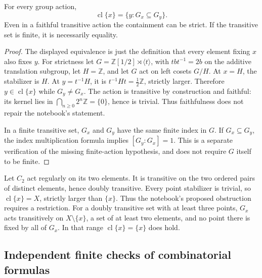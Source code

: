 \begin{proposition}\ours
For every group action,
\[
 \operatorname{cl}\{x\}=\{y:G_x\subseteq G_y\}.
\]
Even in a faithful transitive action the containment can be strict. If the transitive set is finite, it is necessarily equality.
\end{proposition}
\begin{proof}
The displayed equivalence is just the definition that every element fixing \(x\) also fixes \(y\). For strictness let \(G=\mathbb Z[1/2]\rtimes\langle t\rangle\), with \(tbt^{-1}=2b\) on the additive translation subgroup, let \(H=\mathbb Z\), and let \(G\) act on left cosets \(G/H\). At \(x=H\), the stabilizer is \(H\). At \(y=t^{-1}H\), it is \(t^{-1}Ht=\tfrac12\mathbb Z\), strictly larger. Therefore \(y\in\operatorname{cl}\{x\}\) while \(G_y\ne G_x\). The action is transitive by construction and faithful: its kernel lies in \(\bigcap_{n\ge0}2^n\mathbb Z=\{0\}\), hence is trivial. Thus faithfulness does not repair the notebook's statement.

In a finite transitive set, \(G_x\) and \(G_y\) have the same finite index in \(G\). If \(G_x\subseteq G_y\), the index multiplication formula implies \([G_y:G_x]=1\). This is a separate verification of the missing finite-action hypothesis, and does not require \(G\) itself to be finite.
\end{proof}

\begin{example}\ours
Let \(C_2\) act regularly on its two elements. It is transitive on the two ordered pairs of distinct elements, hence doubly transitive. Every point stabilizer is trivial, so \(\operatorname{cl}\{x\}=X\), strictly larger than \(\{x\}\). Thus the notebook's proposed obstruction requires a restriction. For a doubly transitive set with at least three points, \(G_x\) acts transitively on \(X\setminus\{x\}\), a set of at least two elements, and no point there is fixed by all of \(G_x\). In that range \(\operatorname{cl}\{x\}=\{x\}\) does hold.
\end{example}

\subsection{Independent finite checks of combinatorial formulas}


